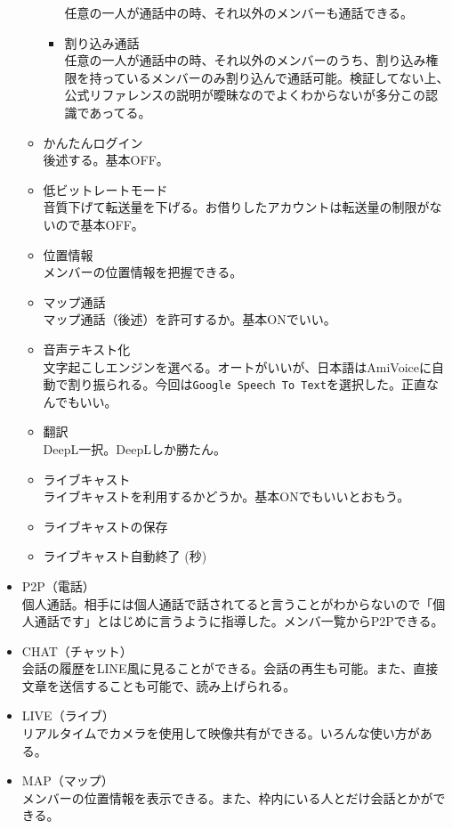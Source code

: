 \documentclass[a4paper]{ltjsreport}
\newcommand{\terlogy}[2][|]{\colorbox{terlogy}{\texttt{\lstinline#1#2#1}}}
\begin{document}
\begin{itemize}
\begin{itemize}
\begin{itemize}
                        任意の一人が通話中の時、それ以外のメンバーも通話できる。
                  \item 割り込み通話\\
                        任意の一人が通話中の時、それ以外のメンバーのうち、割り込み権限を持っているメンバーのみ割り込んで通話可能。検証してない上、公式リファレンスの説明が曖昧なのでよくわからないが多分この認識であってる。
                \end{itemize}
          \item かんたんログイン\\
                後述する。基本OFF。
          \item 低ビットレートモード\\
                音質下げて転送量を下げる。お借りしたアカウントは転送量の制限がないので基本OFF。
          \item 位置情報\\
                メンバーの位置情報を把握できる。
          \item マップ通話\\
                マップ通話（後述）を許可するか。基本ONでいい。
          \item 音声テキスト化\\
                文字起こしエンジンを選べる。オートがいいが、日本語はAmiVoiceに自動で割り振られる。今回は\terlogy{Google Speech To Text}を選択した。正直なんでもいい。
          \item 翻訳\\
                DeepL一択。DeepLしか勝たん。
          \item ライブキャスト\\
                ライブキャストを利用するかどうか。基本ONでもいいとおもう。
          \item ライブキャストの保存
          \item ライブキャスト自動終了 (秒)
        \end{itemize}
  \item P2P（電話）\\
        個人通話。相手には個人通話で話されてると言うことがわからないので「個人通話です」とはじめに言うように指導した。メンバ一覧からP2Pできる。
  \item CHAT（チャット）\\
        会話の履歴をLINE風に見ることができる。会話の再生も可能。また、直接文章を送信することも可能で、読み上げられる。
  \item LIVE（ライブ）\\
        リアルタイムでカメラを使用して映像共有ができる。いろんな使い方がある。
  \item MAP（マップ）\\
        メンバーの位置情報を表示できる。また、枠内にいる人とだけ会話とかができる。
\end{itemize}
\end{document}
